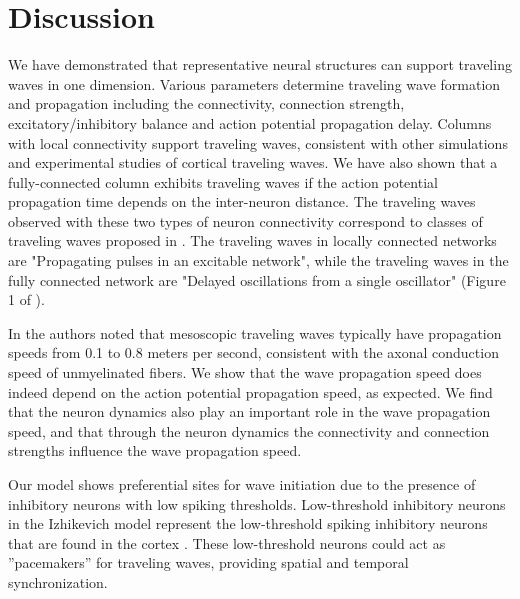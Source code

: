 \documentclass[a4paper,11pt]{article}
\begin{document}
\section{Discussion}
We have demonstrated that representative neural structures can support traveling waves in one dimension.
Various parameters determine traveling wave formation and propagation including the connectivity, connection strength, excitatory/inhibitory balance and action potential propagation delay.
Columns with local connectivity support traveling waves, consistent with other simulations and experimental studies of cortical traveling waves.
We have also shown that  a fully-connected column exhibits traveling waves if the action potential propagation time depends on the inter-neuron distance. 
The traveling waves observed with these two types of neuron connectivity correspond to classes of traveling waves proposed in \cite{ermentrout2001}.
The traveling waves in locally connected networks are "Propagating pulses in an excitable network", while the traveling waves in the fully connected network are "Delayed oscillations from a single oscillator" (Figure 1 of \cite{ermentrout2001}).

In \cite{muller2018} the authors noted that mesoscopic traveling waves typically have propagation speeds from 0.1 to 0.8 meters per second, consistent with the axonal conduction speed of unmyelinated fibers.
We show that the wave propagation speed does indeed depend on the action potential propagation speed, as expected.
We find that the neuron dynamics also play an important role in the wave propagation speed, and that through the neuron dynamics the connectivity and connection strengths influence the wave propagation speed.

Our model shows preferential sites for wave initiation due to the presence of inhibitory neurons with low spiking thresholds.
Low-threshold inhibitory neurons in the Izhikevich model represent the low-threshold spiking inhibitory neurons that are found in the cortex \cite{izhikevich2003}\cite{gibson2009}.
These low-threshold neurons could act as ''pacemakers'' for traveling waves, providing spatial and temporal synchronization.

\clearpage
\printbibliography
\end{document}
